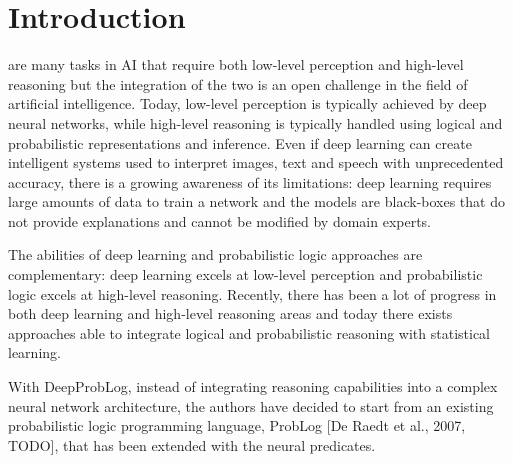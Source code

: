 \section{Introduction}
 are many tasks in AI that require both low-level perception and high-level reasoning but the integration of the two is an open challenge in the field of artificial intelligence. Today, low-level perception is typically achieved by deep neural networks, while high-level reasoning is typically handled using logical and probabilistic representations and inference. Even if deep learning can create intelligent systems used to interpret images, text and speech with unprecedented accuracy, there is a growing awareness of its limitations: deep learning requires large amounts of data to train a network and the models are black-boxes that do not provide explanations and cannot be modified by domain experts. 

The abilities of deep learning and probabilistic logic approaches are complementary: deep learning excels at low-level perception and probabilistic logic excels at high-level reasoning. Recently, there has been a lot of progress in both deep learning and high-level reasoning areas and today there exists approaches able to integrate logical and probabilistic reasoning with statistical learning.

With DeepProbLog, instead of integrating reasoning capabilities into a complex neural network architecture, the authors have decided to start from an existing probabilistic logic programming language, ProbLog [De Raedt et al., 2007, TODO], that has been extended with the neural predicates.
